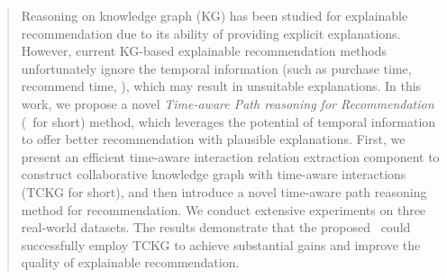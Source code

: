 \begin{abstract}


Reasoning on knowledge graph (KG) has been studied for explainable recommendation due to its ability of providing explicit explanations.
    However, current KG-based explainable recommendation methods unfortunately
    ignore the temporal information (such as purchase time,
    recommend time, \etc), which may result in unsuitable explanations.
%
In this work, we propose a novel  {\it Time-aware Path reasoning 
for Recommendation} (\tkgrec\ for short) method, which leverages the potential 
of temporal information to offer better recommendation with plausible
    explanations.
%
First, we present an efficient time-aware interaction relation 
extraction component
    to construct collaborative knowledge graph with time-aware interactions 
    (TCKG for short), and then 
    introduce
    a novel time-aware path reasoning  method for recommendation.  We conduct
    extensive experiments on three real-world datasets. The results demonstrate that the proposed \tkgrec\ could successfully
    employ TCKG to achieve substantial gains and improve the quality of 
    explainable recommendation. 

\end{abstract}
